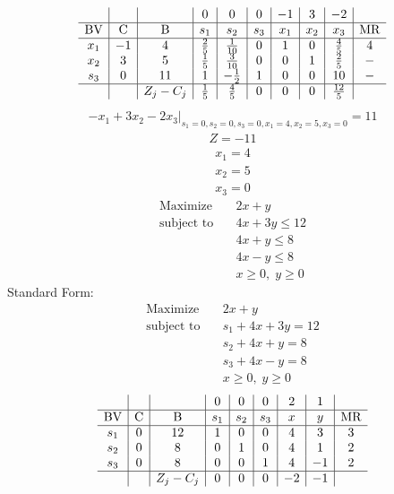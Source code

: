 \documentclass{article}
\begin{document}
\begin{align*}
\begin{array}{c|c|c|c|c|c|c|c|c|c}
 &  &  & 0 & 0 & 0 & -1 & 3 & -2 & \\
\hline
\text{BV} & \text{C} & \text{B} & s_{1} & s_{2} & s_{3} & x_{1} & x_{2} & x_{3} & \text{MR} \\
\hline
x_{1} & -1 & 4 & \frac{2}{5} & \frac{1}{10} & 0 & 1 & 0 & \frac{4}{5} & 4 \\
x_{2} & 3 & 5 & \frac{1}{5} & \frac{3}{10} & 0 & 0 & 1 & \frac{2}{5} & - \\
s_{3} & 0 & 11 & 1 & -\frac{1}{2} & 1 & 0 & 0 & 10 & - \\
\hline
 &  & Z_j-C_j & \frac{1}{5} & \frac{4}{5} & 0 & 0 & 0 & \frac{12}{5} & \\
\end{array}
\end{align*}
\begin{align*}
\left.-x_{1} + 3x_{2} - 2x_{3}\right|_{s_{1}=0,s_{2}=0,s_{3}=0,x_{1}=4,x_{2}=5,x_{3}=0}=11\end{align*}
\begin{align*}
Z=-11\end{align*}
\begin{align*}
x_{1}=4\end{align*}
\begin{align*}
x_{2}=5\end{align*}
\begin{align*}
x_{3}=0\end{align*}
\begin{align*}
\text{Maximize} \quad & 2x + y\\
\text{subject to} \quad
& 4x + 3y\le12\\
& 4x + y\le8\\
& 4x - y\le8\\
& x\ge0,\; y\ge0\end{align*}
Standard Form:\\
\begin{align*}
\text{Maximize} \quad & 2x + y\\
\text{subject to} \quad
& s_{1} + 4x + 3y=12\\
& s_{2} + 4x + y=8\\
& s_{3} + 4x - y=8\\
& x\ge0,\; y\ge0\end{align*}
\begin{align*}
\begin{array}{c|c|c|c|c|c|c|c|c}
 &  &  & 0 & 0 & 0 & 2 & 1 & \\
\hline
\text{BV} & \text{C} & \text{B} & s_{1} & s_{2} & s_{3} & x & y & \text{MR} \\
\hline
s_{1} & 0 & 12 & 1 & 0 & 0 & 4 & 3 & 3 \\
s_{2} & 0 & 8 & 0 & 1 & 0 & 4 & 1 & 2 \\
s_{3} & 0 & 8 & 0 & 0 & 1 & 4 & -1 & 2 \\
\hline
 &  & Z_j-C_j & 0 & 0 & 0 & -2 & -1 & \\
\end{array}
\end{align*}
\end{document}
